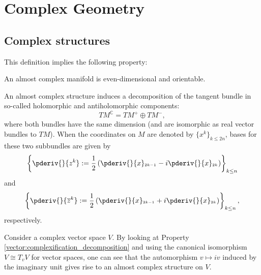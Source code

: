 \chapter{Complex Geometry}\label{chapter:complex_geometry}

\section{Complex structures}


    This definition implies the following property:
    \begin{property}
        An almost complex manifold is even-dimensional and orientable.
    \end{property}

    An almost complex structure induces a decomposition of the tangent bundle in so-called holomorphic and antiholomorphic components:\[TM^\mathbb{C} = TM^+\oplus TM^-,\] where both bundles have the same dimension (and are isomorphic as real vector bundles to $TM$). When the coordinates on $M$ are denoted by $\{x^k\}_{k\leq 2n}$, bases for these two subbundles are given by \[\left\{\pderiv{}{z^k} := \frac{1}{2}\left(\pderiv{}{x}_{^{2k-1}} - i\pderiv{}{x}_{^{2k}}\right)\right\}_{k\leq n}\] and \[\left\{\pderiv{}{\overline{z}^k} := \frac{1}{2}\left(\pderiv{}{x}_{^{2k-1}} + i\pderiv{}{x}_{^{2k}}\right)\right\}_{k\leq n},\] respectively.

    \begin{example}
        Consider a complex vector space $V$. By looking at Property \ref{vector:complexification_decomposition} and using the canonical isomorphism $V\cong T_vV$ for vector spaces, one can see that the automorphism $v\mapsto iv$ induced by the imaginary unit gives rise to an almost complex structure on $V$.
    \end{example}

